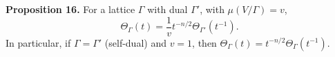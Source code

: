 \textbf{Proposition 16.} For a lattice $\Gamma$ with dual $\Gamma'$, with $\mu(V/\Gamma) = v$,
$$\Theta_\Gamma(t) = \frac{1}{v} t^{-n/2} \Theta_{\Gamma'}(t^{-1}).$$
In particular, if $\Gamma = \Gamma'$ (self-dual) and $v = 1$, then $\Theta_\Gamma(t) = t^{-n/2}\Theta_\Gamma(t^{-1})$.
